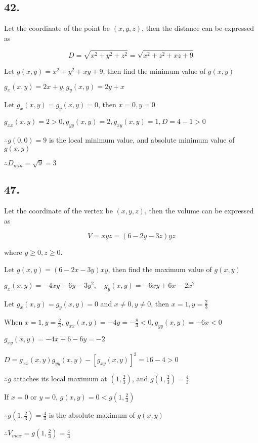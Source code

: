 \documentclass{article}
\begin{document}
  \subsection*{42. }

  Let the coordinate of the point be $(x, y, z)$, then the distance can be expressed as

  $$D = \sqrt{x^2+y^2+z^2} = \sqrt{x^2+z^2+xz + 9}$$

  Let $g(x, y) = x^2+y^2+xy+9$, then find the minimum value of $g(x, y)$

  $g_x(x, y) = 2x + y, g_y(x, y) = 2y + x$

  Let $g_x(x, y) = g_y(x, y) = 0$, then $x = 0, y = 0$

  $g_{xx}(x, y) = 2 > 0, g_{yy}(x, y) = 2, g_{xy}(x, y) = 1, D = 4 - 1 > 0$

  $\therefore g(0, 0) = 9$ is the local minimum value, and absolute minimum value of $g(x, y)$

  $\therefore D_{min} = \sqrt{9} = 3$

  \subsection*{47. }

  Let the coordinate of the vertex be $(x, y, z)$, then the volume can be expressed as 

  $$V = xyz = (6-2y-3z)yz$$

  where $y \geq 0, z \geq 0$.

  Let $g(x, y) = (6-2x-3y)xy$, then find the maximum value of $g(x, y)$

  $g_x(x, y) = -4xy+6y-3y^2, \quad g_y(x, y) = -6xy+6x-2x^2$

  Let $g_x(x, y) = g_y(x, y) = 0$ and $x \not = 0, y \not = 0$, then $x = 1, y = \frac 2 3$

  When $x = 1, y = \frac 2 3$, $g_{xx}(x, y) = -4y = -\frac 8 3 < 0, g_{yy}(x, y) = -6x < 0$

  $g_{xy}(x, y) = -4x+6-6y = -2$

  $D = g_{xx}(x, y)g_{yy}(x, y) - [g_{xy}(x, y)]^2 = 16 - 4 > 0$

  $\therefore g$ attaches its local maximum at $(1, \frac 2 3)$, and $g(1, \frac 2 3) = \frac 4 3$

  If $x = 0$ or $y = 0$, $g(x, y) = 0 < g(1, \frac 2 3)$

  $\therefore g(1, \frac 2 3) = \frac 4 3$ is the absolute maximum of $g(x, y)$

  $\therefore V_{max} = g(1, \frac 2 3) = \frac 4 3$
\end{document}
